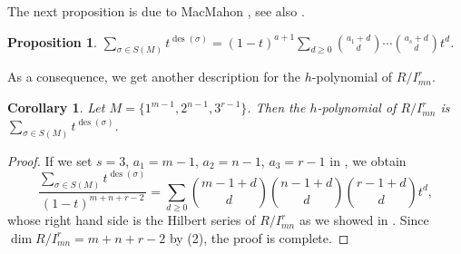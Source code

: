 \documentclass[12pt]{amsart}
\numberwithin{equation}{section}
\newtheorem{proposition}[theorem]{Proposition}
\newtheorem{corollary}[theorem]{Corollary}
\theoremstyle{definition}
\DeclareMathOperator{\des}{des}
\begin{document}
The next proposition is due to MacMahon \cite[Volume 2, p. 211]{MM}, see also \cite[Equation 1.1]{LXZ}.
\begin{proposition}
\label{McMahon}
$\sum_{\sigma\in S(M)}{t^{\des(\sigma)}}=(1-t)^{a+1}\sum_{d\ge 0}\binom{a_1+d}{d}\cdots\binom{a_s+d}{d}t^d$.
\end{proposition}
As a consequence, we get another description for the $h$-polynomial of $R/I_{mn}^r$.
\begin{corollary}
  Let $M=\{1^{m-1},2^{n-1},3^{r-1}\}$. Then the $h$-polynomial of $R/I_{mn}^r$ is $\sum_{\sigma\in S(M)}{t^{\des(\sigma)}}$.
\end{corollary}
\begin{proof}
If we set $s=3$, $a_1=m-1$, $a_2=n-1$, $a_3=r-1$ in , we obtain 
$$
\frac{\sum_{\sigma\in S(M)}{t^{\des(\sigma)}}}{(1-t)^{m+n+r-2}}=\sum_{d\ge 0}\binom{m-1+d}{d}\binom{n-1+d}{d}\binom{r-1+d}{d}t^d,
$$
whose right hand side is the Hilbert series of $R/I_{mn}^r$ as we showed in . Since $\dim R/I_{mn}^r=m+n+r-2$ by (2), the proof is complete. 
\end{proof}
\end{document}
